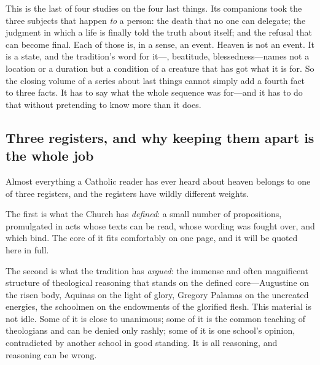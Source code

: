This is the last of four studies on the four last things. Its companions took the three subjects that happen \emph{to} a person: the death that no one can delegate; the judgment in which a life is finally told the truth about itself; and the refusal that can become final. Each of those is, in a sense, an event. Heaven is not an event. It is a state, and the tradition's word for it---, beatitude, blessedness---names not a location or a duration but a condition of a creature that has got what it is for. So the closing volume of a series about last things cannot simply add a fourth fact to three facts. It has to say what the whole sequence was for---and it has to do that without pretending to know more than it does.

\subsection{Three registers, and why keeping them apart is the whole job}

Almost everything a Catholic reader has ever heard about heaven belongs to one of three registers, and the registers have wildly different weights.

The first is what the Church has \emph{defined}: a small number of propositions, promulgated in acts whose texts can be read, whose wording was fought over, and which bind. The core of it fits comfortably on one page, and it will be quoted here in full.

The second is what the tradition has \emph{argued}: the immense and often magnificent structure of theological reasoning that stands on the defined core---Augustine on the risen body, Aquinas on the light of glory, Gregory Palamas on the uncreated energies, the schoolmen on the endowments of the glorified flesh. This material is not idle. Some of it is close to unanimous; some of it is the common teaching of theologians and can be denied only rashly; some of it is one school's opinion, contradicted by another school in good standing. It is all reasoning, and reasoning can be wrong.

